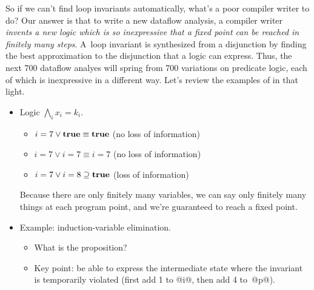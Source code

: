 So if we can't find loop invariants automatically, what's a poor
compiler writer to do?
Our answer is that to write a new dataflow analysis, a compiler writer
\emph{invents a new logic which is so inexpressive that a fixed point
  can be reached in finitely many steps}.
A~loop invariant is synthesized from a disjunction by finding the best
approximation to the disjunction that a logic can express.
Thus, the next 700 dataflow analyes will spring from 700 variations on
predicate logic, each of which is inexpressive in a different way.
Let's review the examples of  in that light.

\begin{itemize}
\item
Logic $\bigwedge_i x_i=k_i$.
\begin{itemize}
\item
$i = 7 \lor \mathbf{true} \equiv \mathbf{true}$ (no loss of information)
\item
$i = 7 \lor i= 7 \equiv  i=7$ (no loss of information)
\item
$i = 7 \lor i = 8 \supseteq \mathbf{true}$ (loss of information)
\end{itemize}
Because there are only finitely many variables, we can say only
finitely many things at each program point, and we're guaranteed to
reach a fixed point.
\item
Example: induction-variable elimination.
\begin{itemize}
\item
What is the proposition?
\item
Key point: be able to express the intermediate state where the
invariant is temporarily violated (first add 1 to @i@, then add 4
to~@p@).
\end{itemize}
\end{itemize}

